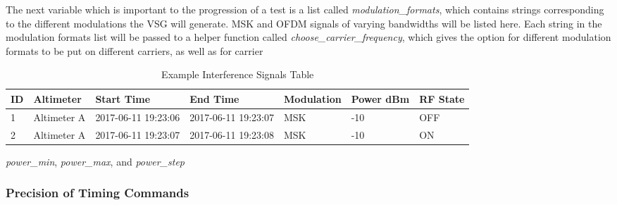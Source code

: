 The next variable which is important to the progression of a test is a list called \textit{modulation\_formats}, which contains strings corresponding to the different modulations the VSG will generate. MSK and OFDM signals of varying bandwidths will be listed here. Each string in the modulation formats list will be passed to a helper function called \textit{choose\_carrier\_frequency\(\)}, which gives the option for different modulation formats to be put on different carriers, as well as for carrier 
\begin{table}[]
\begin{tabular}{@{}lllllll@{}}
\toprule
ID & Altimeter   & Start Time          & End Time            & Modulation & Power dBm & RF State \\ \midrule
1  & Altimeter A & 2017-06-11 19:23:06 & 2017-06-11 19:23:07 & MSK        & -10       & OFF      \\
2  & Altimeter A & 2017-06-11 19:23:07 & 2017-06-11 19:23:08 & MSK        & -10       & ON       \\ \bottomrule
\end{tabular}
\caption{Example Interference Signals Table}
\label{tab:Interference}
\end{table}
 \textit{power\_min}, \textit{power\_max}, and \textit{power\_step} 


\subsubsection{Precision of Timing Commands}



